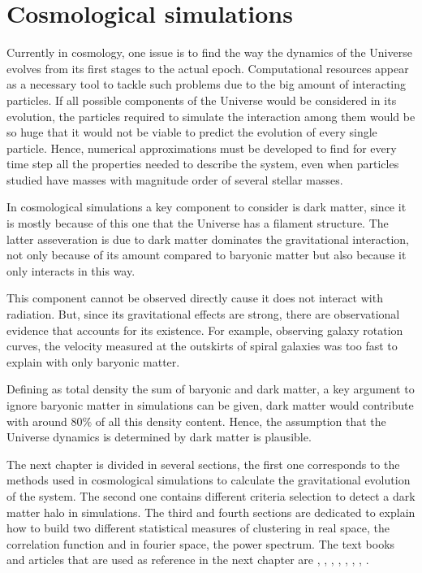 \chapter{ Cosmological simulations }


Currently in cosmology, one issue is to find the way
the dynamics of the Universe evolves from its first 
stages to the actual epoch. Computational resources 
appear as a necessary tool to tackle such problems
due to the big amount of interacting particles. 
If all possible components of the Universe would be considered 
in its evolution, the particles required to simulate 
the interaction among them would be so huge that it would not be viable
to predict the evolution of every single particle. Hence, numerical approximations 
must be developed to find for every time step all the properties needed to describe 
the system, even when particles studied have masses with magnitude order of several 
stellar masses. 

In cosmological simulations a key component to consider
is dark matter, since it is mostly because of this one that 
the Universe has a filament structure. 
The latter asseveration is due to dark matter dominates the gravitational
interaction, not only because of its amount compared to
baryonic matter but also because it only interacts in this way.

This component cannot be observed directly cause it does not interact 
with radiation. But, since its gravitational effects are strong, there are 
observational evidence that accounts for its existence. For example, 
observing galaxy rotation curves, the velocity measured at the outskirts 
of spiral galaxies was too fast to explain with only baryonic matter. 

Defining as total density the sum of baryonic and dark matter,
a key argument to ignore baryonic matter in simulations can be
given, dark matter would contribute with around $80\%$ of all 
this density content. Hence, the assumption that the Universe
dynamics is determined by dark matter is plausible.

The next chapter is divided in several sections, the first one
corresponds to the methods used in cosmological simulations to
calculate the gravitational evolution of the system. The second
one contains different criteria selection to detect a dark matter
halo in simulations. The third and fourth sections are dedicated
to explain how to build two different statistical measures of clustering
in real space, the correlation function and in fourier space, the power spectrum. 
The text books and articles that are used as reference in the next chapter
are \cite{Djeong}, \cite{Longair}, \cite{tree}, \cite{Klypin}, \cite{Klypin2},
\cite{Klypin3}, \cite{Jing}, \cite{Mont}.


